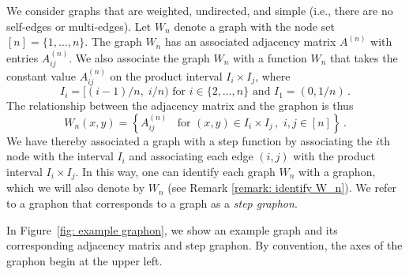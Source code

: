 \documentclass[11pt]{amsart}
\numberwithin{equation}{section}
\begin{document}
We consider graphs that are weighted, undirected, and simple (i.e., there are no self-edges or multi-edges). Let $W_n$ denote a graph with the node set $[n] = \{1, \ldots, n\}$. {The graph $W_n$} has an associated adjacency matrix $A^{(n)}$ with entries 
$A^{(n)}_{ij}$. We {also} associate the graph $W_n$ with a function $W_n$ that takes the constant value $A^{(n)}_{ij}$ on the product interval $I_i \times I_j$, where 
\begin{equation}\label{eq: def interval}
    I_i = [(i - 1)/n, \; i/n) \text{ for } i \in \{2,\ldots, n \} \text{ and } I_1 = (0, 1/n)\,.     
\end{equation}
The relationship between the adjacency matrix and the graphon is thus 
\begin{equation}   \label{eq: step graphon} 
    W_n(x,y) = \left\{ A^{(n)}_{ij} \;\; \text{ for } (x,y) \in I_i \times I_j\,, \,\,  i,j \in {[n]}  \right\}  \,.
\end{equation}
We have thereby associated a graph with a step function by associating the $i$th node with the interval $I_i$ and associating each edge $(i,j)$ with the product interval $I_i \times I_j$. In this way, one can identify each graph $W_n$ with a graphon, which we will also denote by $W_n$ (see Remark \ref{remark: identify W_n}). We refer to a graphon that corresponds to a graph as a \textit{step graphon}.  

In Figure~\ref{fig: example graphon}, we show an example graph and its corresponding adjacency matrix and step graphon. By convention, the axes of the graphon begin at the upper left.
\end{document}
